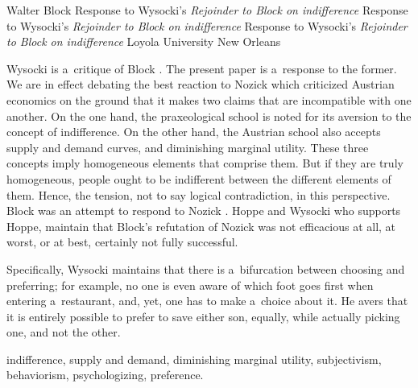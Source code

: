 \begin{artengenv}{Walter Block}
	{Response to Wysocki's \textit{Rejoinder to Block on indifference}}
	{Response to Wysocki's \textit{Rejoinder to Block on indifference}}
	{Response to Wysocki's \textit{Rejoinder to Block on indifference}}
	{Loyola University New Orleans\label{block-rejoinder-firstpage}}
	{Wysocki 
	\parencite*[][]{wysocki_rejoinder_2024} %
	 is a~critique of Block 
	\parencite*[][]{block_response_2022}. %
	 The present paper is a~response to the former. We are in effect debating the best reaction to Nozick 
	\parencite*[][]{nozick_austrian_1977} %
	 which criticized Austrian economics on the ground that it makes two claims that are incompatible with one another. On the one hand, the praxeological school is noted for its aversion to the concept of indifference. On the other hand, the Austrian school also accepts supply and demand curves, and diminishing marginal utility. These three concepts imply homogeneous elements that comprise them. But if they are truly homogeneous, people ought to be indifferent between the different elements of them. Hence, the tension, not to say logical contradiction, in this perspective. Block 
	\parencite*[][]{block_robert_1980} %
	 was an attempt to respond to Nozick 
	\parencite*[][]{nozick_austrian_1977}. %
	 Hoppe 
	\parencites*[][]{hoppe_note_2005}[][]{hoppe_must_2005}[][]{hoppe_further_2009} %
	 and Wysocki 
	\parencites*[][]{wysocki_indifference_2016}[][]{wysocki_caplan_2017}[][]{wysocki_problem_2021}[][]{wysocki_rejoinder_2024} %
	 who supports Hoppe, maintain that Block's refutation of Nozick 
	\parencite*[][]{nozick_austrian_1977} %
	 was not efficacious at all, at worst, or at best, certainly not fully successful.
	
	
	
	Specifically, Wysocki maintains that there is a~bifurcation between choosing and preferring; for example, no one is even aware of which foot goes first when entering a~restaurant, and, yet, one has to make a~choice about it. He avers that it is entirely possible to prefer to save either son, equally, while actually picking one, and not the other.
	}
	{indifference, supply and demand, diminishing marginal utility, subjectivism, behaviorism, psychologizing, preference.}





\end{artengenv}
